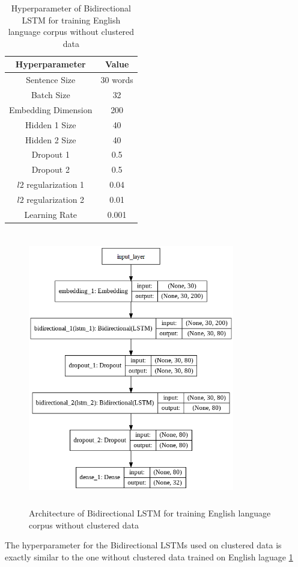 \begin{table}[!ht]
\centering
\begin{tabular}{cc}
\hline
\textbf{Hyperparameter} & \textbf{Value} \\ \hline
Sentence Size & 30 words \\
Batch Size & 32 \\
Embedding Dimension & 200 \\
Hidden 1 Size & 40 \\
Hidden 2 Size & 40 \\
Dropout 1 & 0.5 \\
Dropout 2 & 0.5 \\
$l2$ regularization 1 & 0.04 \\
$l2$ regularization 2 & 0.01 \\
Learning Rate & 0.001 \\ \hline
\end{tabular}
 \captionsetup{justification=centering,margin=2cm}
\caption{Hyperparameter of Bidirectional LSTM for training English language corpus without clustered data}
\label{table:hyperparameterLSTM32class}
\end{table}


\begin{figure}[!ht]
    \centering
    \includegraphics[width=9cm, height=12cm]{pics/EN_32.png}
    \captionsetup{justification=centering,margin=2cm}
    \caption{Architecture of Bidirectional LSTM for training English language corpus without clustered data}
    \label{fig:PlainLSTM}
\end{figure}
\clearpage
The hyperparameter for the Bidirectional LSTMs used on clustered data is exactly similar to the one without clustered data trained on English laguage \ref{table:hyperparameterLSTM32class}

